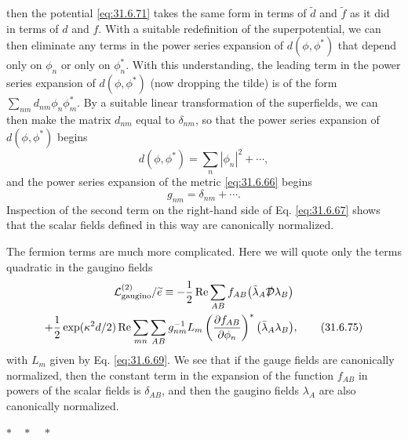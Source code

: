 then the potential \eqref{eq:31.6.71} takes the same form in terms of
\(\widetilde d\) and \(\widetilde f\) as it did in terms of \(d\) and
\(f\). With a suitable redefinition of the superpotential, we can then
eliminate any terms in the power series expansion of \(d(\phi,\phi^*)\)
that depend only on \(\phi_n\) or only on \(\phi_n^*\). With this
understanding, the leading term in the power series expansion of
\(d(\phi,\phi^*)\) (now dropping the tilde) is of the form
\(\sum_{nm}d_{nm}\phi_n\phi_m^*\). By a suitable linear transformation
of the superfields, we can then make the matrix \(d_{nm}\) equal to
\(\delta_{nm}\), so that the power series expansion of
\(d(\phi,\phi^*)\) begins
\begin{equation}
  d(\phi,\phi^*)=\sum_n|\phi_n|^2+\cdots,
  \tag{31.6.73}\label{eq:31.6.73}
\end{equation}
and the power series expansion of the metric \eqref{eq:31.6.66} begins
\begin{equation}
  g_{nm}=\delta_{nm}+\cdots.
  \tag{31.6.74}\label{eq:31.6.74}
\end{equation}
Inspection of the second term on the right-hand side of
Eq. \eqref{eq:31.6.67} shows that the scalar fields defined in this way
are canonically normalized.

The fermion terms are much more complicated. Here we will quote only
the terms quadratic in the gaugino fields
\begin{multline}
  \mathcal L_{\mathrm{gaugino}}^{(2)}/\widetilde e
  \equiv
  -\frac{1}{2}\operatorname{Re}\sum_{AB}f_{AB}
    \bigl(\bar\lambda_A\sl{\mathcal D}\lambda_B\bigr)\\
  +\frac{1}{2}\exp(\kappa^2d/2)
    \operatorname{Re}\sum_{mn}\sum_{AB}
    g^{-1}_{nm}L_m
    \left(\frac{\partial f_{AB}}{\partial\phi_n}\right)^*
    \bigl(\bar\lambda_A\lambda_B\bigr),
  \tag{31.6.75}\label{eq:31.6.75}
\end{multline}
with \(L_m\) given by Eq. \eqref{eq:31.6.69}. We see that if the gauge
fields are canonically normalized, then the constant term in the
expansion of the function \(f_{AB}\) in powers of the scalar fields is
\(\delta_{AB}\), and then the gaugino fields \(\lambda_A\) are also
canonically normalized.

\begin{center}
  \(\ast\quad\ast\quad\ast\)
\end{center}

